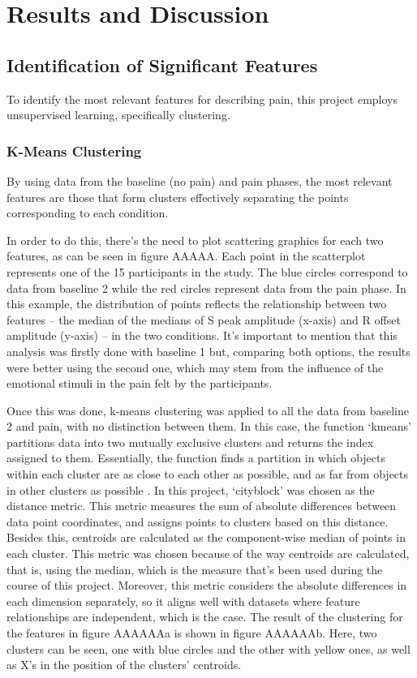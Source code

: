 \chapter{Results and Discussion}

\section{Identification of Significant Features}

To identify the most relevant features for describing pain, this project employs unsupervised learning, specifically clustering. 

\subsection{K-Means Clustering}



By using data from the baseline (no pain) and pain phases, the most relevant features are those that form clusters effectively separating the points corresponding to each condition.

In order to do this, there’s the need to plot scattering graphics for each two features, as can be seen in figure AAAAA. Each point in the scatterplot represents one of the 15 participants in the study. The blue circles correspond to data from baseline 2 while the red circles represent data from the pain phase. In this example, the distribution of points reflects the relationship between two features – the median of the medians of S peak amplitude (x-axis) and R offset amplitude (y-axis) – in the two conditions. It’s important to mention that this analysis was firstly done with baseline 1 but, comparing both options, the results were better using the second one, which may stem from the influence of the emotional stimuli in the pain felt by the participants.



Once this was done, k-means clustering was applied to all the data from baseline 2 and pain, with no distinction between them. In this case, the function ‘kmeans’ partitions data into two mutually exclusive clusters and returns the index assigned to them. Essentially, the function finds a partition in which objects within each cluster are as close to each other as possible, and as far from objects in other clusters as possible \cite{Cluster}. In this project, ‘cityblock’ was chosen as the distance metric. This metric measures the sum of absolute differences between data point coordinates, and assigns points to clusters based on this distance. Besides this, centroids are calculated as the component-wise median of points in each cluster. This metric was chosen because of the way centroids are calculated, that is, using the median, which is the measure that’s been used during the course of this project. Moreover, this metric considers the absolute differences in each dimension separately, so it aligns well with datasets where feature relationships are independent, which is the case.
The result of the clustering for the features in figure AAAAAAa is shown in figure AAAAAAb. Here, two clusters can be seen, one with blue circles and the other with yellow ones, as well as X’s in the position of the clusters’ centroids.

